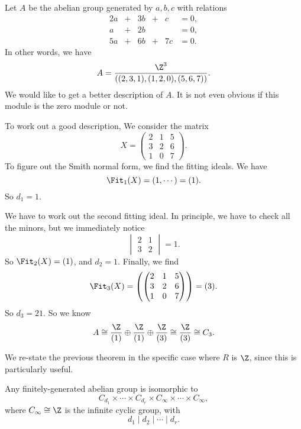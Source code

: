 \documentclass[a4paper]{article}
\begin{document}
\begin{eg}
  Let $A$ be the abelian group generated by $a, b, c$ with relations
  \[
    \begin{alignedat}{4}
      2a & {}+{} & 3b & {}+{} & c &= 0,\\
      a & {}+{} & 2b & & &= 0,\\
      5a & {}+{} & 6b & {}+{} & 7c &= 0.
    \end{alignedat}
  \]
  In other words, we have
  \[
    A = \frac{\Z^3}{((2, 3, 1), (1, 2, 0), (5, 6, 7))}.
  \]
  We would like to get a better description of $A$. It is not even obvious if this module is the zero module or not.

  To work out a good description, We consider the matrix
  \[
    X =
    \begin{pmatrix}
      2 & 1 & 5\\
      3 & 2 & 6\\
      1 & 0 & 7
    \end{pmatrix}.
  \]
  To figure out the Smith normal form, we find the fitting ideals. We have
  \[
    \Fit_1(X) = (1, \cdots) = (1).
  \]
  So $d_1 = 1$.

  We have to work out the second fitting ideal. In principle, we have to check all the minors, but we immediately notice
  \[
    \begin{vmatrix}
      2 & 1\\
      3 & 2
    \end{vmatrix} = 1.
  \]
  So $\Fit_2(X) = (1)$, and $d_2 = 1$. Finally, we find
  \[
    \Fit_3(X) =
    \left(\begin{pmatrix}
      2 & 1 & 5\\
      3 & 2 & 6\\
      1 & 0 & 7
    \end{pmatrix}\right) = (3).
  \]
  So $d_3 = 21$. So we know
  \[
    A \cong \frac{\Z}{(1)} \oplus \frac{\Z}{(1)} \oplus \frac{\Z}{(3)} \cong \frac{\Z}{(3)} \cong C_3.
  \]
\end{eg}

We re-state the previous theorem in the specific case where $R$ is $\Z$, since this is particularly useful.
\begin{cor}
  Any finitely-generated abelian group is isomorphic to
  \[
    C_{d_1} \times \cdots \times C_{d_r} \times C_\infty \times \cdots \times C_\infty,
  \]
  where $C_\infty \cong \Z$ is the infinite cyclic group, with
  \[
    d_1 \mid d_2 \mid \cdots \mid d_r.
  \]
\end{cor}
\end{document}
